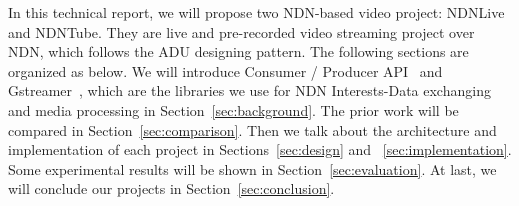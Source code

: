 In this technical report, we will propose two NDN-based video project: NDNLive and NDNTube. They are live and pre-recorded video streaming project over NDN, which follows the ADU designing pattern. The following sections are organized as below. We will introduce Consumer / Producer API~\cite{api-tr} and Gstreamer~\cite{gstreamer}, which are the libraries we use for NDN Interests-Data exchanging and media processing in Section~\ref{sec:background}. The prior work will be compared in Section~\ref{sec:comparison}. Then we talk about the architecture and implementation of each project in Sections~\ref{sec:design} and ~\ref{sec:implementation}. Some experimental results will be shown in Section~\ref{sec:evaluation}. At last, we will conclude our projects in Section~\ref{sec:conclusion}.

